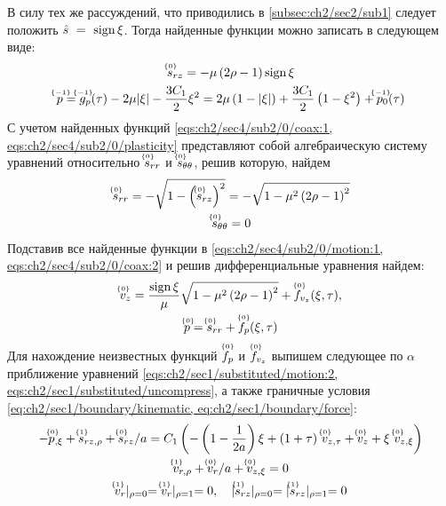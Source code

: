 В силу тех же рассуждений, что приводились в \ref{subsec:ch2/sec2/sub1} следует положить $\hat{s}~=~\sign\xi$. Тогда найденные функции можно записать в следующем виде:
\begin{gather}
  \label{sol:ch2/sec4/sub2/srz/0}
  \uindex{s}{0}_{rz} = -\mu \left(2\rho - 1\right) \sign \xi
  \\
  \label{sol:ch2/sec4/sub2/p/-1}
  \uindex{p}{-1} = \uindex{g}{-1}_{p}(\tau) -2\mu\lvert\xi\rvert - \frac{3 C_1}{2}\xi^2 = 2\mu\left(1-\lvert\xi\rvert\right) + \frac{3 C_1}{2}\left(1-\xi^2\right) + \uindex{p}{-1}_{0}(\tau)
\end{gather}
С учетом найденных функций \cref{eqs:ch2/sec4/sub2/0/coax:1, eqs:ch2/sec4/sub2/0/plasticity} представляют собой алгебраическую систему уравнений относительно $\uindex{s}{0}_{rr}$ и $\uindex{s}{0}_{\theta\theta}$, решив которую, найдем
\begin{gather}
  \label{sol:ch2/sec4/sub2/srr/0}
  \uindex{s}{0}_{rr} = -\sqrt{1-\left(\uindex{s}{0}_{rz}\right)^2} = -\sqrt{1-\mu^2\left(2\rho-1\right)^2}
  \\
  \label{sol:ch2/sec4/sub2/stt/0}
  \uindex{s}{0}_{\theta\theta} = 0
\end{gather}
Подставив все найденные функции в \cref{eqs:ch2/sec4/sub2/0/motion:1, eqs:ch2/sec4/sub2/0/coax:2} и решив дифференциальные уравнения найдем:
\begin{gather}
  \label{sol:ch2/sec4/sub2/vz/0}
  \uindex{v}{0}_{z} = \frac{\sign\xi}{\mu}\sqrt{1-\mu^2\left(2\rho-1\right)^2} + \uindex{f}{0}_{v_{z}}(\xi,\tau),
  \\
  \label{sol:ch2/sec4/sub2/p/0}
  \uindex{p}{0} = \uindex{s}{0}_{rr} +\uindex{f}{0}_{p}(\xi,\tau)
\end{gather}
Для нахождение неизвестных функций $\uindex{f}{0}_{p}$ и $\uindex{f}{0}_{v_{z}}$ выпишем следующее по $\alpha$ приближение уравнений \cref{eqs:ch2/sec1/substituted/motion:2, eqs:ch2/sec1/substituted/uncompress}, а также граничные условия \cref{eq:ch2/sec1/boundary/kinematic, eq:ch2/sec1/boundary/force}:
\begin{gather}
  \label{eqs:ch2/sec4/sub2/1/motion:1}
  -\uindex{p}{0}_{,\xi} + \uindex{s}{1}_{rz,\rho} + \uindex{s}{0}_{rz} / a = C_1 \left(-\left(1-\frac{1}{2a}\right)\xi + (1+\tau) \ \uindex{v}{0}_{z,\tau} + \uindex{v}{0}_{z} + \xi \ \uindex{v}{0}_{z,\xi}\vphantom{\frac{1}{2a}}\right)
  \\
  \label{eqs:ch2/sec4/sub2/1/uncompress}
  \uindex{v}{1}_{r,\rho} + \uindex{v}{0}_{r} / a + \uindex{v}{0}_{z,\xi} = 0
  \\
  \label{eq:ch2/sec4/sub2/boundary/1}
  \uindex{v}{1}_{r}\lvert_{\rho=0} = \uindex{v}{1}_{r}\lvert_{\rho=1} = 0, \quad \lvert \uindex{s}{1}_{rz}\lvert_{\rho=0} = \lvert \uindex{s}{1}_{rz}\lvert_{\rho=1} = 0
\end{gather}
